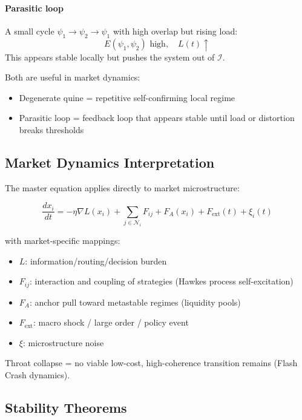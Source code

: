 \documentclass[11pt,a4paper]{article}
\begin{document}
\paragraph{Parasitic loop}
A small cycle $\psi_1 \to \psi_2 \to \psi_1$ with high overlap but rising load:
\begin{equation}
E(\psi_1, \psi_2) \text{ high}, \quad L(t) \uparrow
\label{eq:parasitic_loop}
\end{equation}
This appears stable locally but pushes the system out of $\mathcal{I}$.

Both are useful in market dynamics:
\begin{itemize}
    \item Degenerate quine = repetitive self-confirming local regime
    \item Parasitic loop = feedback loop that appears stable until load or distortion breaks thresholds
\end{itemize}

\subsection{Market Dynamics Interpretation}

The master equation applies directly to market microstructure:

\begin{equation}
\frac{dx_i}{dt} = -\eta \nabla L(x_i) + \sum_{j \in \mathcal{N}_i} F_{ij} + F_A(x_i) + F_{\mathrm{ext}}(t) + \xi_i(t)
\end{equation}

with market-specific mappings:
\begin{itemize}
    \item $L$: information/routing/decision burden
    \item $F_{ij}$: interaction and coupling of strategies (Hawkes process self-excitation)
    \item $F_A$: anchor pull toward metastable regimes (liquidity pools)
    \item $F_{\mathrm{ext}}$: macro shock / large order / policy event
    \item $\xi$: microstructure noise
\end{itemize}

Throat collapse = no viable low-cost, high-coherence transition remains (Flash Crash dynamics).

\subsection{Stability Theorems}
\end{document}
